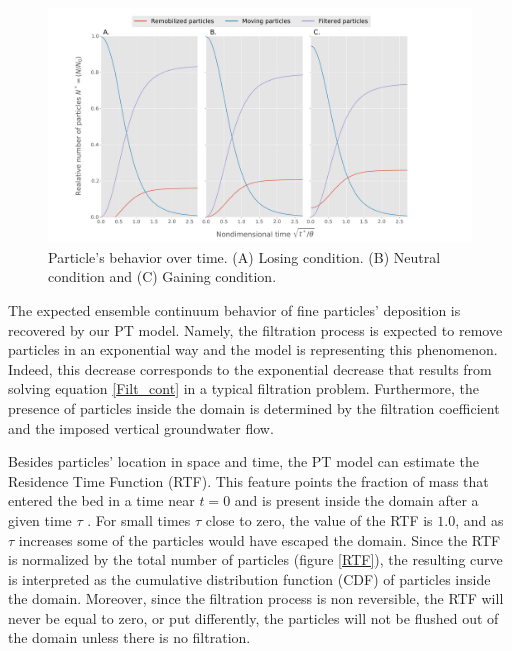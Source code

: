 \documentclass[draft,linenumbers]{agujournal2018}
\begin{document}
\begin{figure}
\centering
\includegraphics[trim=0.2cm 0.2cm 0.2cm 0.2cm, width=60pc]
{190131_Pvst.pdf}
\caption{Particle's behavior over time. (A) Losing condition. (B) Neutral condition and (C) Gaining condition.}
\label{Pvst}
\end{figure}

The expected ensemble continuum behavior of fine particles' deposition is recovered by our PT model. Namely, the filtration process is expected to remove particles in an exponential way and the model is representing this phenomenon. Indeed, this decrease corresponds to the exponential decrease that results from solving equation \ref{Filt_cont} in a typical filtration problem. Furthermore, the presence of particles inside the domain is determined by the filtration coefficient and the imposed vertical groundwater flow.  

Besides particles' location in space and time, the PT model can estimate the Residence Time Function (RTF). This feature points the fraction of mass that entered the bed in a time near $t = 0$ and is present inside the domain after a given time $\tau$ \citep{Elliott1997,Packman2000}. For small times $\tau$ close to zero, the value of the RTF is $1.0$, and as $\tau$ increases some of the particles would have escaped the domain. Since the RTF is normalized by the total number of particles (figure \ref{RTF}), the resulting curve is interpreted as the cumulative distribution function (CDF) of particles inside the domain. Moreover, since the filtration process is non reversible, the RTF will never be equal to zero, or put differently, the particles will not be flushed out of the domain unless there is no filtration.
\end{document}
